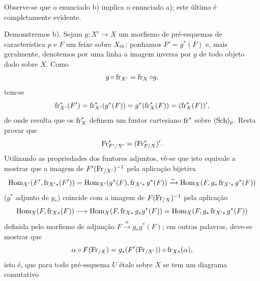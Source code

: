 Observe-se que o enunciado b) implica o enunciado a); este último é completamente evidente.

Demonstremos b). Sejam $g:X'\to X$ um morfismo de pré-esquemas de característica $p$ e $F$ um feixe sobre $X_{\mathrm{\acute{e}t}}$; ponhamos $F'=g^*(F)$ e, mais geralmente, denotemos por uma linha a imagem inversa por $g$ de todo objeto dado sobre $X$. Como
\[
g\circ\operatorname{fr}_{X'}=\operatorname{fr}_X\circ g,
\]
tem-se
\[
\operatorname{fr}_{X'}^*(F')=\operatorname{fr}_{X'}^*(g^*(F))=g^*(\operatorname{fr}_X^*(F))=(\operatorname{fr}_X^*(F))',
\]
de onde resulta que os $\operatorname{fr}_X^*$ definem um funtor cartesiano $\operatorname{fr}^*$ sobre $(\operatorname{Sch})_p$. Resta provar que
\[
\operatorname{Fr}^*_{F'/X'}=(\operatorname{Fr}^*_{F/X})'.
\]
Utilizando as propriedades dos funtores adjuntos, vê-se que isto equivale a mostrar que a imagem de $F'(\operatorname{Fr}_{/X'})^{-1}$ pela aplicação bijetiva
\[
\operatorname{Hom}_{X'}(F',\operatorname{fr}_{X'*}(F'))
 =\operatorname{Hom}_{X'}(g^*(F),\operatorname{fr}_{X'*}g^*(F))
 \xrightarrow{\sim} \operatorname{Hom}_X(F,g_*\operatorname{fr}_{X'*}g^*(F))
\]
($g^*$ adjunto de $g_*$) coincide com a imagem de $F(\operatorname{Fr}_{/X})^{-1}$ pela aplicação
\[
\operatorname{Hom}_X(F,\operatorname{fr}_{X*}(F))\longrightarrow
\operatorname{Hom}_X(F,\operatorname{fr}_{X*}g_*g^*(F))=
\operatorname{Hom}_X(F,g_*\operatorname{fr}_{X'*}g^*(F))
\]
definida pelo morfismo de adjunção $F\xrightarrow{\alpha} g_*g^*(F)$; em outras palavras, deve-se mostrar que
\[
\alpha\circ F(\operatorname{Fr}_{/X})=g_*(F'(\operatorname{Fr}_{/X'}))\circ\operatorname{fr}_{X*}(\alpha),
\]
isto é, que para todo pré-esquema $U$ étale sobre $X$ se tem um diagrama comutativo

